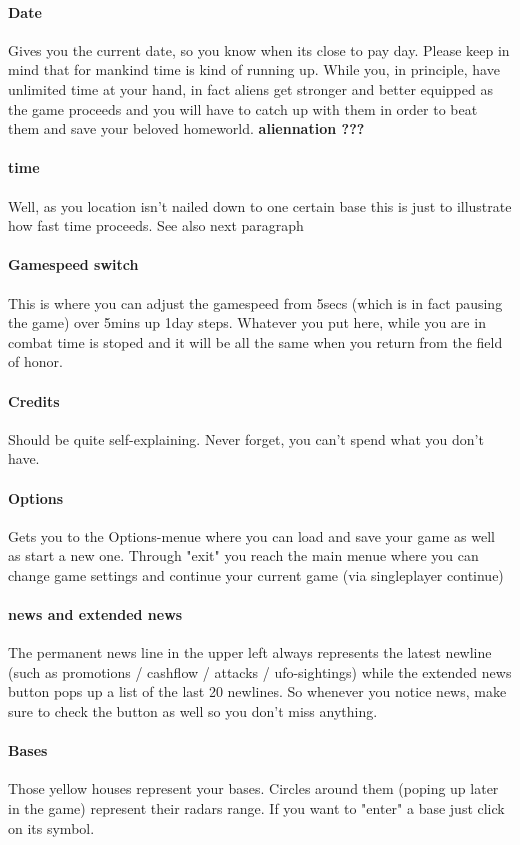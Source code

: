 \paragraph*{Date}
Gives you the current date, so you know when its close to pay day. Please keep in mind that for mankind time is kind of running up. While you, in principle, have unlimited time at your hand, in fact aliens get stronger and better equipped as the game proceeds and you will have to catch up with them in order to beat them and save your beloved homeworld.
\textbf{aliennation ???}
\paragraph*{time}
Well, as you location isn't nailed down to one certain base this is just to illustrate how fast time proceeds. See also next paragraph
\paragraph*{Gamespeed switch}
This is where you can adjust the gamespeed from 5secs (which is in fact pausing the game) over 5mins up 1day steps. Whatever you put here, while you are in combat time is stoped and it will be all the same when you return from the field of honor.
\paragraph*{Credits}
Should be quite self-explaining. Never forget, you can't spend what you don't have.
\paragraph*{Options}
Gets you to the Options-menue where you can load and save your game as well as start a new one.
Through "exit" you reach the main menue where you can change game settings and continue your current game (via singleplayer \hookrightarrow continue)
\paragraph*{news and extended news}
The permanent news line in the upper left always represents the latest newline (such as promotions / cashflow / attacks / ufo-sightings) while the extended news button pops up a list of the last 20 newlines.
So whenever you notice news, make sure to check the button as well so you don't miss anything. 
\paragraph*{Bases}
Those yellow houses represent your bases. Circles around them (poping up later in the game) represent their radars range.  If you want to "enter" a base just click on its symbol.
